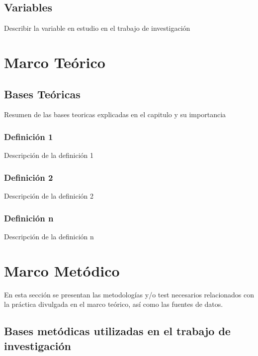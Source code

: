\documentclass[oneside,11pt]{Latex/Classes/PhDthesisPSnPDF}
\begin{document}
\section{Variables}

Describir la variable en estudio en el trabajo de investigación

\chapter{Marco Teórico}

\section{Bases Teóricas}

Resumen de las bases teoricas explicadas en el capitulo y su
importancia\\

\subsection{Definición 1}

Descripción de la definición 1\\

\subsection{Definición 2}

Descripción de la definición 2\\

\subsection{Definición n}

Descripción de la definición n\\

\chapter{Marco Metódico}

En esta sección se presentan las metodologías y/o test necesarios
relacionados con la práctica divulgada en el marco teórico, así como las
fuentes de datos.

\section{Bases metódicas utilizadas en el trabajo de investigación}
\end{document}
